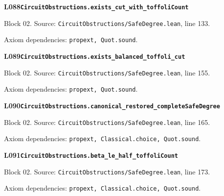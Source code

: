 \begin{minipage}{\linewidth}
\hypertarget{L088}{}
{\small\sffamily\bfseries\color{ink}L088\quad\nolinkurl{CircuitObstructions.exists_cut_with_toffoliCount}}\par
{\scriptsize\sffamily\color{muted}Block 02. Source: \nolinkurl{CircuitObstructions/SafeDegree.lean}, line 133.}\par
{}
{\scriptsize\sffamily\color{muted}Axiom dependencies: \nolinkurl{propext, Quot.sound}.}
\end{minipage}\par\medskip
{}\par\medskip
\begin{minipage}{\linewidth}
\hypertarget{L089}{}
{\small\sffamily\bfseries\color{ink}L089\quad\nolinkurl{CircuitObstructions.exists_balanced_toffoli_cut}}\par
{\scriptsize\sffamily\color{muted}Block 02. Source: \nolinkurl{CircuitObstructions/SafeDegree.lean}, line 155.}\par
{}
{\scriptsize\sffamily\color{muted}Axiom dependencies: \nolinkurl{propext, Quot.sound}.}
\end{minipage}\par\medskip
\begin{minipage}{\linewidth}
\hypertarget{L090}{}
{\small\sffamily\bfseries\color{ink}L090\quad\nolinkurl{CircuitObstructions.canonical_restored_completeSafeDegree}}\par
{\scriptsize\sffamily\color{muted}Block 02. Source: \nolinkurl{CircuitObstructions/SafeDegree.lean}, line 165.}\par
{}
{\scriptsize\sffamily\color{muted}Axiom dependencies: \nolinkurl{propext, Classical.choice, Quot.sound}.}
\end{minipage}\par\medskip
\begin{minipage}{\linewidth}
\hypertarget{L091}{}
{\small\sffamily\bfseries\color{ink}L091\quad\nolinkurl{CircuitObstructions.beta_le_half_toffoliCount}}\par
{\scriptsize\sffamily\color{muted}Block 02. Source: \nolinkurl{CircuitObstructions/SafeDegree.lean}, line 173.}\par
{}
{\scriptsize\sffamily\color{muted}Axiom dependencies: \nolinkurl{propext, Classical.choice, Quot.sound}.}
\end{minipage}\par\medskip
